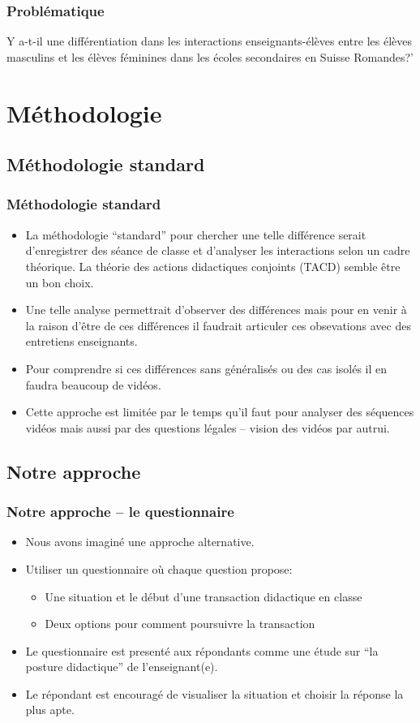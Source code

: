 \documentclass{beamer}
\begin{document}
\begin{frame}
\frametitle{Problématique}
\begin{block}{ }
Y a-t-il une différentiation dans les interactions enseignants-élèves entre les élèves masculins et les élèves féminines dans les écoles secondaires en Suisse Romandes?'
\end{block}
\end{frame}

\section{Méthodologie}
\subsection{Méthodologie standard}
\begin{frame}
\frametitle{Méthodologie standard}
\begin{itemize}
\item La méthodologie ``standard'' pour chercher une telle différence serait d'enregistrer des séance de classe et d'analyser
les interactions selon un cadre théorique. La théorie des actions didactiques conjoints (TACD) semble être un bon choix.
\item Une telle analyse permettrait d'observer des différences mais pour en venir à la raison d'être de ces différences il faudrait articuler ces obsevations avec des entretiens enseignants.
\item Pour comprendre si ces différences sans généralisés ou des cas isolés il en faudra beaucoup de vidéos.
\item Cette approche est limitée par le temps qu'il faut pour analyser des séquences vidéos mais aussi par des questions
légales -- vision des vidéos par autrui.  
\end{itemize}
\end{frame}

\subsection{Notre approche}
\begin{frame}
\frametitle{Notre approche -- le questionnaire}
\begin{itemize}
\item Nous avons imaginé une approche alternative.
\item Utiliser un questionnaire où chaque question propose:
  \begin{itemize}
   \item Une situation et le début d'une transaction didactique en classe
   \item Deux options pour comment poursuivre la transaction 
  \end{itemize}
\item Le questionnaire est presenté aux répondants comme une étude sur
  ``la posture didactique'' de l'enseignant(e).
\item Le répondant est encouragé de visualiser la situation et choisir la
  réponse la plus apte. 
\end{itemize}
\end{frame}
\end{document}
